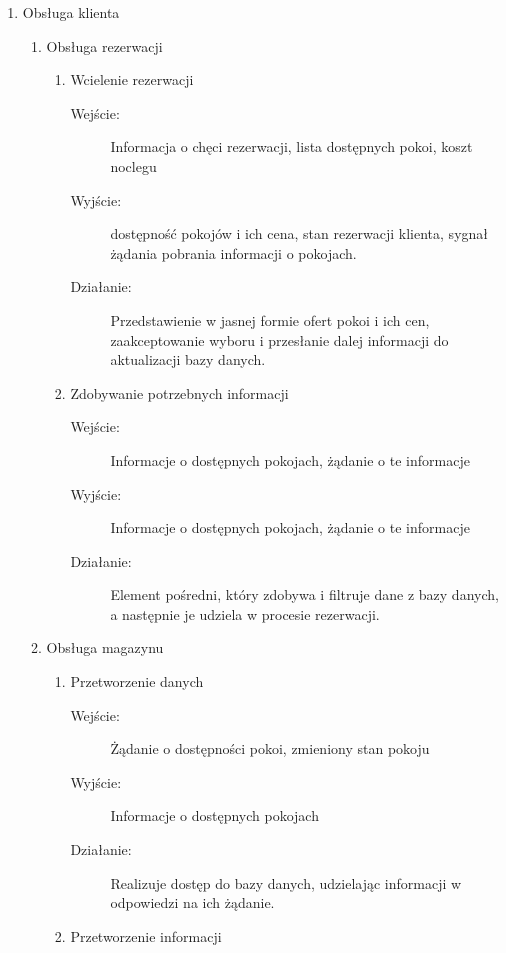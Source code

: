 \documentclass[a4paper, 11pt]{article}
\begin{document}
\begin{enumerate}[label*=\arabic*.]
\begin{enumerate}[label*=\arabic*.]
\begin{description}
			\end{description}	
		\end{enumerate}
		\item Obsługa klienta
		\begin{enumerate}[label*=\arabic*.]
			\item Obsługa rezerwacji
			\begin{enumerate}[label*=\arabic*.]
				\item Wcielenie rezerwacji
				\begin{description}
					\item[Wejście:] Informacja o chęci rezerwacji, lista dostępnych pokoi, koszt noclegu
					\item[Wyjście:] dostępność pokojów i ich cena, stan rezerwacji klienta, sygnał żądania pobrania informacji o pokojach.
					\item[Działanie:] Przedstawienie w jasnej formie ofert pokoi i ich cen, zaakceptowanie wyboru i przesłanie dalej informacji do aktualizacji bazy danych.
				\end{description}	
				\item Zdobywanie potrzebnych informacji
				\begin{description}
					\item[Wejście:] Informacje o dostępnych pokojach, żądanie o te informacje
					\item[Wyjście:] Informacje o dostępnych pokojach, żądanie o te informacje
					\item[Działanie:] Element pośredni, który zdobywa i filtruje dane z bazy danych, a następnie je udziela w procesie rezerwacji.
				\end{description}	
			\end{enumerate}
			\item Obsługa magazynu
			\begin{enumerate}[label*=\arabic*.]
				\item Przetworzenie danych
				\begin{description}
					\item[Wejście:] Żądanie o dostępności pokoi, zmieniony stan pokoju
					\item[Wyjście:] Informacje o dostępnych pokojach
					\item[Działanie:] Realizuje dostęp do bazy danych, udzielając informacji w odpowiedzi na ich żądanie.
				\end{description}	
				\item Przetworzenie informacji
				\begin{description}

\end{description}
\end{enumerate}
\end{enumerate}
\end{enumerate}
\end{document}
